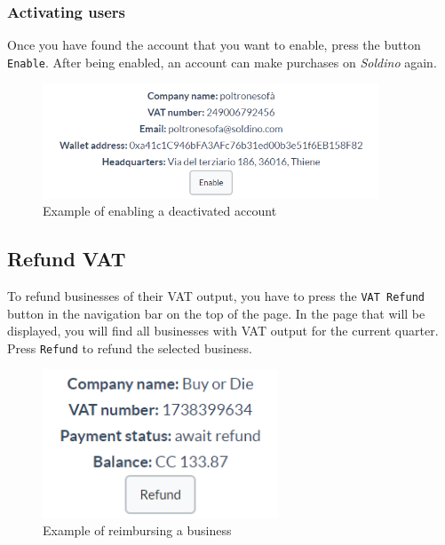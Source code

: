 		\subsubsection{Activating users}
		Once you have found the account that you want to enable, press the button 
		\texttt{Enable}. After being enabled, an account can make 
		purchases on \textit{Soldino} again.
		\begin{figure}[H]
			\includegraphics[width=10cm]{res/images/user_enable.png}
			\centering
			\caption{Example of enabling a deactivated account}
		\end{figure}
	\subsection{Refund VAT}
	To refund businesses of their VAT output, you have to press the \texttt{VAT 
	Refund} button in the navigation bar on the top of the page. In the 
	page that will be displayed, you will find all businesses with VAT output for the current quarter.
	Press \texttt{Refund} to refund the selected business.
	\begin{figure}[H]
		\includegraphics[width=7cm]{res/images/business_refund.png}
		\centering
		\caption{Example of reimbursing a business}
	\end{figure}